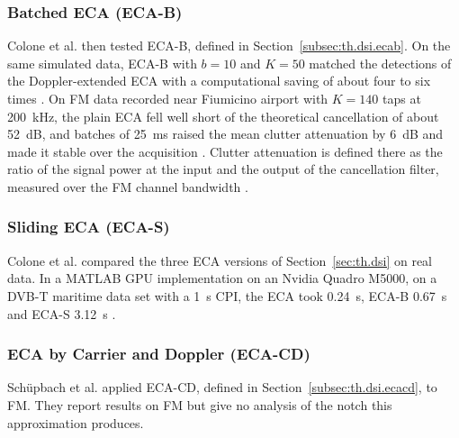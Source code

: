 \subsubsection{Batched ECA (ECA-B)}
\label{subsubsec:ch2.chain.dsi.ecab}
\todo{}
Colone et al. \citep{colone2009} then tested ECA-B, defined in Section~\ref{subsec:th.dsi.ecab}. On the same simulated data, ECA-B with $b = 10$ and $K = 50$ matched the detections of the Doppler-extended ECA with a computational saving of about four to six times \citep{colone2009}. On FM data recorded near Fiumicino airport with $K = 140$ taps at 200~kHz, the plain ECA fell well short of the theoretical cancellation of about 52~dB, and batches of 25~ms raised the mean clutter attenuation by 6~dB and made it stable over the acquisition \citep{colone2016}. Clutter attenuation is defined there as the ratio of the signal power at the input and the output of the cancellation filter, measured over the FM channel bandwidth \citep{colone2016}.

\subsubsection{Sliding ECA (ECA-S)}
\label{subsubsec:ch2.chain.dsi.ecas}
\todo{}
Colone et al. \citep{colone2016} compared the three ECA versions of Section~\ref{sec:th.dsi} on real data. In a MATLAB GPU implementation on an Nvidia Quadro M5000, on a DVB-T maritime data set with a 1~s CPI, the ECA took 0.24~s, ECA-B 0.67~s and ECA-S 3.12~s \citep{colone2016}.

\subsubsection{ECA by Carrier and Doppler (ECA-CD)}
\label{subsubsec:ch2.chain.dsi.ecacd}
\todo{}
Schüpbach et al. \citep{schuepbach2020} applied ECA-CD, defined in Section~\ref{subsec:th.dsi.ecacd}, to FM. They report results on FM but give no analysis of the notch this approximation produces.


